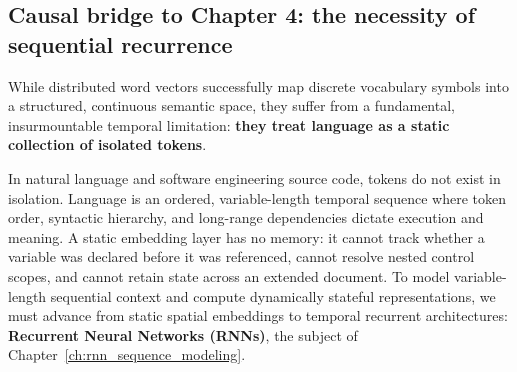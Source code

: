 \documentclass[../../main.tex]{subfiles}
\begin{document}
\subsection{Causal bridge to Chapter 4: the necessity of sequential recurrence}
\label{subsec:bridge_to_chapter_4}

While distributed word vectors successfully map discrete vocabulary symbols into a structured, continuous semantic space, they suffer from a fundamental, insurmountable temporal limitation: \textbf{they treat language as a static collection of isolated tokens}. 

In natural language and software engineering source code, tokens do not exist in isolation. Language is an ordered, variable-length temporal sequence where token order, syntactic hierarchy, and long-range dependencies dictate execution and meaning. A static embedding layer has no memory: it cannot track whether a variable was declared before it was referenced, cannot resolve nested control scopes, and cannot retain state across an extended document. To model variable-length sequential context and compute dynamically stateful representations, we must advance from static spatial embeddings to temporal recurrent architectures: \textbf{Recurrent Neural Networks (RNNs)}, the subject of Chapter~\ref{ch:rnn_sequence_modeling}.
\end{document}
